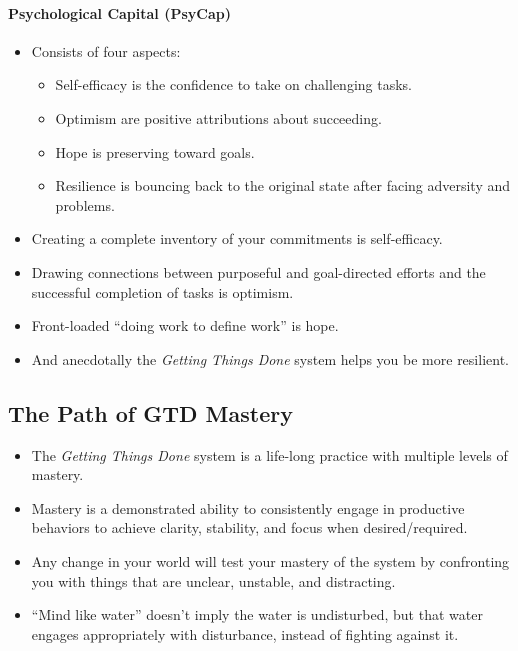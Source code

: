 \documentclass{article}
\begin{document}
\paragraph{Psychological Capital (PsyCap)}

\begin{itemize}
 \item Consists of four aspects:
 \begin{itemize}
  \item Self-efficacy is the confidence to take on challenging tasks.
  \item Optimism are positive attributions about succeeding.
  \item Hope is preserving toward goals.
  \item Resilience is bouncing back to the original state after facing adversity and problems.
 \end{itemize}
 \item Creating a complete inventory of your commitments is self-efficacy.
 \item Drawing connections between purposeful and goal-directed efforts and the successful completion of tasks is optimism.
 \item Front-loaded ``doing work to define work'' is hope.
 \item And anecdotally the \textit{Getting Things Done} system helps you be more resilient.
\end{itemize}

\subsection{The Path of GTD Mastery}

\begin{itemize}
 \item The \textit{Getting Things Done} system is a life-long practice with multiple levels of mastery.
 \item Mastery is a demonstrated ability to consistently engage in productive behaviors to achieve clarity, stability, and focus when desired/required.
 \item Any change in your world will test your mastery of the system by confronting you with things that are unclear, unstable, and distracting.
 \item ``Mind like water'' doesn't imply the water is undisturbed, but that water engages appropriately with disturbance, instead of fighting against it.
\end{itemize}
\end{document}
